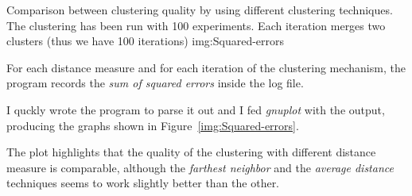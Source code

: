       {Comparison between clustering quality by using different clustering
       techniques. The clustering has been run with 100 experiments. Each
       iteration merges two clusters (thus we have 100 iterations)}
      {img:Squared-errors}
      {\textwidth}

For each distance measure and for each iteration of the clustering
mechanism, the  program records the \emph{sum of squared errors} inside the log file.

I quckly wrote the  program to parse it out and I fed
\emph{gnuplot} with the output, producing the graphs shown in
Figure~\ref{img:Squared-errors}.

The plot highlights that the quality of the clustering with different
distance measure is comparable, although the \emph{farthest neighbor} and
the \emph{average distance} techniques seems to work slightly better than
the other.
